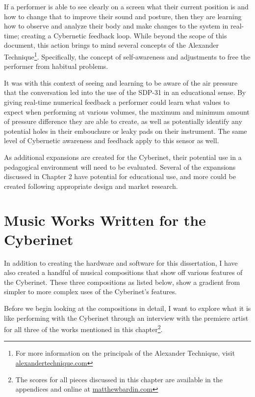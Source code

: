 If a performer is able to see clearly on a screen what their current position is and how to change that to improve their sound and posture, then they are learning how to observe and analyze their body and make changes to the system in real-time; creating a Cybernetic feedback loop.\cite{WeinerCybernetics2019} While beyond the scope of this document, this action brings to mind several concepts of the Alexander Technique\footnote{For more information on the principals of the Alexander Technique, visit \url{alexandertechnique.com}}. Specifically, the concept of self-awareness and adjustments to free the performer from habitual problems.\cite{gelbBodyLearning2013}

It was with this context of seeing and learning to be aware of the air pressure that the conversation led into the use of the SDP-31 in an educational sense. By giving real-time numerical feedback a performer could learn what values to expect when performing at various volumes, the maximum and minimum amount of pressure difference they are able to create, as well as potentially identify any potential holes in their embouchure or leaky pads on their instrument. The same level of Cybernetic awareness and feedback apply to this sensor as well.

As additional expansions are created for the Cyberinet, their potential use in a pedagogical environment will need to be evaluated. Several of the expansions discussed in Chapter 2 have potential for educational use, and more could be created following appropriate design and market research.

\chapter{Music Works Written for the Cyberinet}

In addition to creating the hardware and software for this dissertation, I have also created a handful of musical compositions that show off various features of the Cyberinet. These three compositions as listed below, show a gradient from simpler to more complex uses of the Cyberinet’s features.

Before we begin looking at the compositions in detail, I want to explore what it is like performing with the Cyberinet through an interview with the premiere artist for all three of the works mentioned in this chapter\footnote{The scores for all pieces discussed in this chapter are available in the appendices and online at \url{matthewbardin.com}}.


